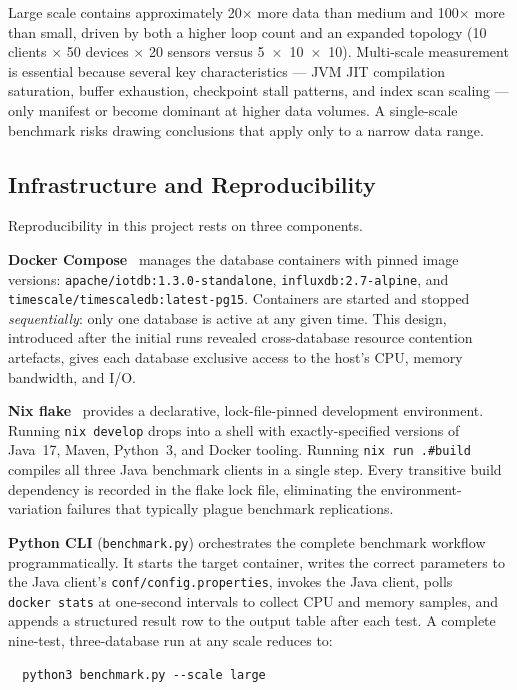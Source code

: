 Large scale contains approximately 20$\times$ more data than medium and 100$\times$ more
than small, driven by both a higher loop count and an expanded topology (10 clients
$\times$ 50 devices $\times$ 20 sensors versus 5~$\times$~10~$\times$~10). Multi-scale
measurement is essential because several key characteristics --- JVM JIT compilation
saturation, buffer exhaustion, checkpoint stall patterns, and index scan scaling --- only
manifest or become dominant at higher data volumes. A single-scale benchmark risks drawing
conclusions that apply only to a narrow data range.

\subsection{Infrastructure and Reproducibility}
\label{sec:infrastructure}

Reproducibility in this project rests on three components.

\textbf{Docker Compose}~\cite{docker} manages the database containers with pinned image
versions: \texttt{apache/iotdb:1.3.0-standalone}, \texttt{influxdb:2.7-alpine}, and
\texttt{timescale/timescaledb:latest-pg15}. Containers are started and stopped
\textit{sequentially}: only one database is active at any given time. This design, introduced
after the initial runs revealed cross-database resource contention artefacts, gives each
database exclusive access to the host's CPU, memory bandwidth, and I/O.

\textbf{Nix flake}~\cite{nixos} provides a declarative, lock-file-pinned development
environment. Running \texttt{nix~develop} drops into a shell with exactly-specified versions
of Java~17, Maven, Python~3, and Docker tooling. Running \texttt{nix~run~.\#build} compiles
all three Java benchmark clients in a single step. Every transitive build dependency is
recorded in the flake lock file, eliminating the environment-variation failures that
typically plague benchmark replications.

\textbf{Python CLI} (\texttt{benchmark.py}) orchestrates the complete benchmark workflow
programmatically. It starts the target container, writes the correct parameters to
the Java client's \texttt{conf/config.properties}, invokes the Java client, polls
\texttt{docker~stats} at one-second intervals to collect CPU and memory samples, and appends
a structured result row to the output table after each test. A complete nine-test,
three-database run at any scale reduces to:

\begin{verbatim}
  python3 benchmark.py --scale large
\end{verbatim}

